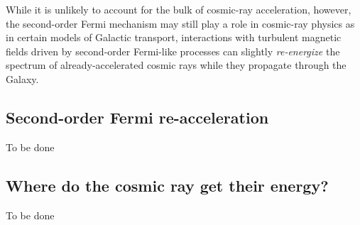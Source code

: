 While it is unlikely to account for the bulk of cosmic-ray acceleration, however, the second-order Fermi mechanism may still play a role in cosmic-ray physics as in certain models of Galactic transport, interactions with turbulent magnetic fields driven by second-order Fermi-like processes can slightly \emph{re-energize} the spectrum of already-accelerated cosmic rays while they propagate through the Galaxy.

\subsection{Second-order Fermi re-acceleration}

{\color{red}To be done}

\subsection{Where do the cosmic ray get their energy?}

{\color{red}To be done}





